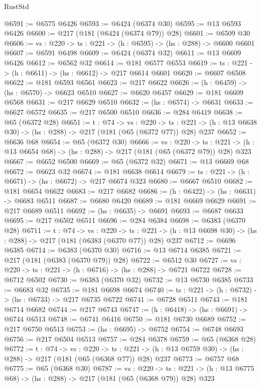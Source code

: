 \begin{lexlean}{RustStd}
\begin{coremodule}
@6591 := @6575 @6426
@6593 := @6424 (@6374 @30)
@6595 := @13 @6593 @6426
@6600 := @217 (@181 (@6424 (@6374 @79)) @28)
@6601 := @6509 @30
@6606 := {vs : @220} -> {ts : @221} -> (h : @6595) -> (hs : @288) -> @6600 @6601
@6607 := @6591 @6498
@6609 := @6424 (@6374 @32)
@6611 := @13 @6609 @6426
@6612 := @6562 @32
@6614 := @181 @6577 @6553
@6619 := {ts : @221} -> (h : @6611) -> (hs : @6612) -> @217 @6614 @6601
@6620 := @6607 @6508
@6622 := @181 @6593 @6561
@6623 := @217 @6622
@6626 := (h : @6459) -> (hs : @6570) -> @6623 @6510
@6627 := @6620 @6457
@6629 := @181 @6609 @6568
@6631 := @217 @6629 @6510
@6632 := (hs : @6574) -> @6631
@6633 := @6627 @6572
@6635 := @217 @6500 @6510
@6636 := @284 @6419
@6638 := @65 (@6372 @28)
@6651 := {t : @74} ->
  {vs : @220} ->
  {ts : @221} -> (h : @13 @6638 @30) -> (hs : @288) -> @217 (@181 (@65 (@6372 @77)) @28) @237
@6652 := @6636 @68
@6654 := @65 (@6372 @30)
@6666 := {vs : @220} ->
  {ts : @221} -> (h : @13 @6654 @68) -> (hs : @288) -> @217 (@181 (@65 (@6372 @79)) @28) @323
@6667 := @6652 @6500
@6669 := @65 (@6372 @32)
@6671 := @13 @6669 @68
@6672 := @6623 @32
@6674 := @181 @6638 @6614
@6679 := {ts : @221} -> (h : @6671) -> (hs : @6672) -> @217 @6674 @323
@6680 := @6667 @6510
@6682 := @181 @6654 @6622
@6683 := @217 @6682
@6686 := (h : @6422) -> (hs : @6631) -> @6683 @6511
@6687 := @6680 @6420
@6689 := @181 @6669 @6629
@6691 := @217 @6689 @6511
@6692 := (hs : @6635) -> @6691
@6693 := @6687 @6633
@6695 := @217 @6502 @6511
@6696 := @284 @6384
@6698 := @6383 (@6370 @28)
@6711 := {t : @74} ->
  {vs : @220} ->
  {ts : @221} -> (h : @13 @6698 @30) -> (hs : @288) -> @217 (@181 (@6383 (@6370 @77)) @28) @237
@6712 := @6696 @6385
@6714 := @6383 (@6370 @30)
@6716 := @13 @6714 @6385
@6721 := @217 (@181 (@6383 (@6370 @79)) @28)
@6722 := @6512 @30
@6727 := {vs : @220} -> {ts : @221} -> (h : @6716) -> (hs : @288) -> @6721 @6722
@6728 := @6712 @6502
@6730 := @6383 (@6370 @32)
@6732 := @13 @6730 @6385
@6733 := @6683 @32
@6735 := @181 @6698 @6674
@6740 := {ts : @221} -> (h : @6732) -> (hs : @6733) -> @217 @6735 @6722
@6741 := @6728 @6511
@6743 := @181 @6714 @6682
@6744 := @217 @6743
@6747 := (h : @6418) -> (hs : @6691) -> @6744 @6513
@6748 := @6741 @6416
@6750 := @181 @6730 @6689
@6752 := @217 @6750 @6513
@6753 := (hs : @6695) -> @6752
@6754 := @6748 @6693
@6756 := @217 @6504 @6513
@6757 := @284 @6378
@6759 := @65 (@6368 @28)
@6772 := {t : @74} ->
  {vs : @220} ->
  {ts : @221} -> (h : @13 @6759 @30) -> (hs : @288) -> @217 (@181 (@65 (@6368 @77)) @28) @237
@6773 := @6757 @68
@6775 := @65 (@6368 @30)
@6787 := {vs : @220} ->
  {ts : @221} -> (h : @13 @6775 @68) -> (hs : @288) -> @217 (@181 (@65 (@6368 @79)) @28) @323

\end{coremodule}
\end{lexlean}

